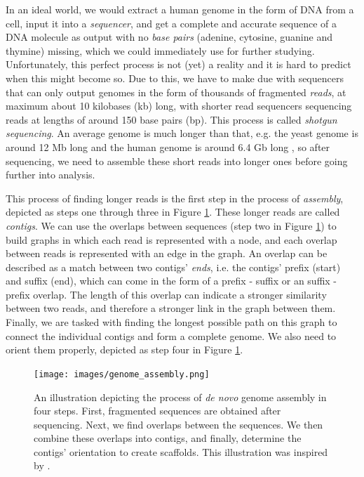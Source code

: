 \documentclass[times, utf8, diplomski, english]{fer_eng}
\begin{document}
In an ideal world, we would extract a human genome in the form of DNA from a cell, input it into a \textit{sequencer}, and get a complete and accurate sequence of a DNA molecule as output with no \textit{base pairs} (adenine, cytosine, guanine and thymine) missing, which we could immediately use for further studying. Unfortunately, this perfect process is not (yet) a reality and it is hard to predict when this might become so. Due to this, we have to make due with sequencers that can only output genomes in the form of thousands of fragmented \textit{reads}, at maximum about 10 kilobases (kb) long, with shorter read sequencers sequencing reads at lengths of around 150 base pairs (bp). This process is called \textit{shotgun sequencing}. An average genome is much longer than that, e.g. the yeast genome is around 12 Mb long \cite{yeast} and the human genome is around 6.4 Gb long \cite{human}, so after sequencing, we need to assemble these short reads into longer ones before going further into analysis.

This process of finding longer reads is the first step in the process of \textit{assembly}, depicted as steps one through three in Figure \ref{fig:genome assembly}. These longer reads are called \textit{contigs}. We can use the overlaps between sequences (step two in Figure \ref{fig:genome assembly}) to build graphs in which each read is represented with a node, and each overlap between reads is represented with an edge in the graph. An overlap can be described as a match between two contigs' \textit{ends}, i.e. the contigs' prefix (start) and suffix (end), which can come in the form of a prefix - suffix or an suffix - prefix overlap. The length of this overlap can indicate a stronger similarity between two reads, and therefore a stronger link in the graph between them. Finally, we are tasked with finding the longest possible path on this graph to connect the individual contigs and form a complete genome. We also need to orient them properly, depicted as step four in Figure \ref{fig:genome assembly}.

\begin{figure}
	\centering
	\texttt{[image: images/genome\_assembly.png]}
	\caption[Genome assembly]{An illustration depicting the process of \textit{de novo} genome assembly in four steps. First, fragmented sequences are obtained after sequencing. Next, we find overlaps between the sequences. We then combine these overlaps into contigs, and finally, determine the contigs' orientation to create scaffolds. This illustration was inspired by \cite{baker_2012}.}
	\label{fig:genome assembly}
\end{figure}
\end{document}
